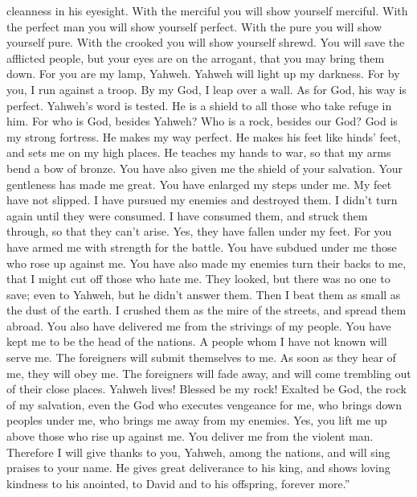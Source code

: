 cleanness in his eyesight.  With the merciful you will show
yourself merciful. With the perfect man you will show yourself perfect.
 With the pure you will show yourself pure. With the
crooked you will show yourself shrewd.  You will save the
afflicted people, but your eyes are on the arrogant, that you may bring
them down.  For you are my lamp, Yahweh. Yahweh will light
up my darkness.  For by you, I run against a troop. By my
God, I leap over a wall.  As for God, his way is perfect.
Yahweh's word is tested. He is a shield to all those who take refuge in
him.  For who is God, besides Yahweh? Who is a rock,
besides our God?  God is my strong fortress. He makes my
way perfect.  He makes his feet like hinds' feet, and sets
me on my high places.  He teaches my hands to war, so that
my arms bend a bow of bronze.  You have also given me the
shield of your salvation. Your gentleness has made me great.
 You have enlarged my steps under me. My feet have not
slipped.  I have pursued my enemies and destroyed them. I
didn't turn again until they were consumed.  I have
consumed them, and struck them through, so that they can't arise. Yes,
they have fallen under my feet.  For you have armed me with
strength for the battle. You have subdued under me those who rose up
against me.  You have also made my enemies turn their backs
to me, that I might cut off those who hate me.  They
looked, but there was no one to save; even to Yahweh, but he didn't
answer them.  Then I beat them as small as the dust of the
earth. I crushed them as the mire of the streets, and spread them
abroad.  You also have delivered me from the strivings of
my people. You have kept me to be the head of the nations. A people whom
I have not known will serve me.  The foreigners will submit
themselves to me. As soon as they hear of me, they will obey me.
 The foreigners will fade away, and will come trembling out
of their close places.  Yahweh lives! Blessed be my rock!
Exalted be God, the rock of my salvation,  even the God who
executes vengeance for me, who brings down peoples under me,
 who brings me away from my enemies. Yes, you lift me up
above those who rise up against me. You deliver me from the violent man.
 Therefore I will give thanks to you, Yahweh, among the
nations, and will sing praises to your name.  He gives
great deliverance to his king, and shows loving kindness to his
anointed, to David and to his offspring, forever more.''

